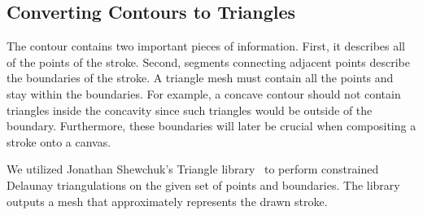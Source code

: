\documentclass[review]{acmsiggraph}
\begin{document}

\subsection{Converting Contours to Triangles}
The contour contains two important pieces of information. First, it describes all of the points of the stroke.
Second, segments connecting adjacent points describe the boundaries of the stroke. 
A triangle mesh must contain all the points and stay
within the boundaries. For example, a concave contour should not contain triangles inside the concavity since such triangles
would be outside of the boundary.
Furthermore, these boundaries will later be crucial when compositing a stroke onto a canvas.

We utilized Jonathan Shewchuk's Triangle library~\cite{XXX} to perform constrained Delaunay triangulations
on the given set of points and boundaries. The library outputs a mesh that
approximately represents the drawn stroke.
\end{document}
